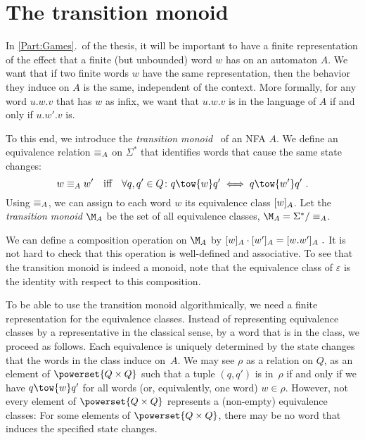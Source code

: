 \documentclass[../../diss.tex]{subfiles}
\begin{document}
\section{The transition monoid}%
\label{Section:TransitionMonoid}%

In \cref{Part:Games}.~of the thesis, it will be important to have a finite representation of the effect that a finite (but unbounded) word $w$ has on an automaton $A$.
We want that if two finite words $w$  have the same representation, then the behavior they induce on $A$ is the same, independent of the context.
More formally, for any word $u.w.v$ that has $w$ as infix, we want that $u.w.v$ is in the language of $A$ if and only if $u.w'.v$ is.

To this end, we introduce the \emph{transition monoid}~\cite{Buechi62,PerrinP04} of an NFA $A$.
We define an equivalence relation $\nfaequiv{A}$ on $\Sigma^*$ that identifies words that cause the same state changes:
\[
    w \nfaequiv{A} w'
    \quad \text{iff} \quad
    \forall q,q' \in Q \colon
    q \tow{w} q' \iff q \tow{w'} q'
    \ .
\]
Using $\nfaequiv{A}$, we can assign to each word $w$ its equivalence class $\nfaequivclass{A}{w}$.
Let the \emph{transition monoid} $\nfatransmonoid{A}$ be the set of all equivalence classes, \ie $\nfatransmonoid{A} = \Sigma^* / \nfaequiv{A}$.

We can define a composition operation on $\nfatransmonoid{A}$ by
\(
    \nfaequivclass{A}{w} \relcomp \nfaequivclass{A}{w'} = \nfaequivclass{A}{w.w'}
    \ .
\)
It is not hard to check that this operation is well-defined and associative.
To see that the transition monoid is indeed a monoid, note that the equivalence class of $\varepsilon$ is the identity with respect to this composition.

To be able to use the transition monoid algorithmically, we need a finite representation for the equivalence classes.
Instead of representing equivalence classes by a representative in the classical sense, \ie by a word that is in the class, we proceed as follows.
Each equivalence  is uniquely determined by the state changes that the words in the class induce on~$A$.
We may see $\rho$ as a relation on $Q$, \ie as an element of $\powerset{Q \times Q}$ such that a tuple $(q,q')$ is in~$\rho$ if and only if we have $q \tow{w} q'$ for all words (or, equivalently, one word) $w \in \rho$.
However, not every element of $\powerset{Q \times Q}$ represents a (non-empty) equivalence classes:
For some elements of $\powerset{Q \times Q}$, there may be no word that induces the specified state changes.
\end{document}
